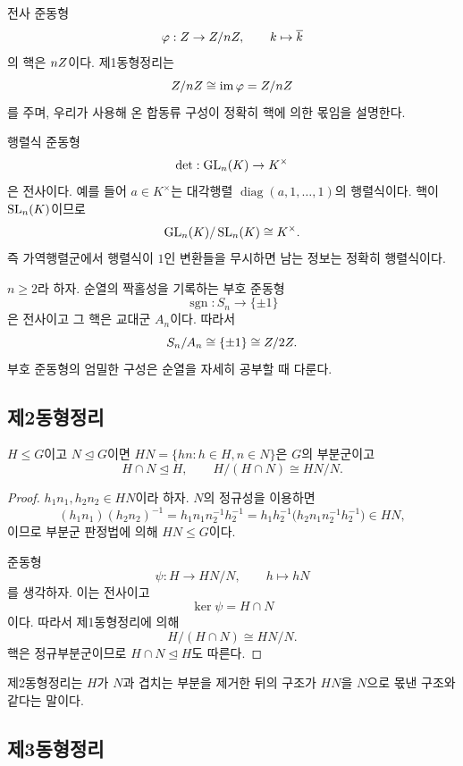 \begin{example}[합동류]
전사 준동형
\[
  \varphi:Z\to Z/nZ,
  \qquad k\mapsto\overline k
\]
의 핵은 $nZ$이다. 제1동형정리는
\[
  Z/nZ\cong\operatorname{im}\varphi=Z/nZ
\]
를 주며, 우리가 사용해 온 합동류 구성이 정확히 핵에 의한 몫임을 설명한다.
\end{example}

\begin{example}
행렬식 준동형
\[
  \det:\operatorname{GL}_n(K)\to K^\times
\]
은 전사이다. 예를 들어 $a\in K^\times$는 대각행렬 $\operatorname{diag}(a,1,\dots,1)$의 행렬식이다. 핵이 $\operatorname{SL}_n(K)$이므로
\[
  \operatorname{GL}_n(K)/\operatorname{SL}_n(K)\cong K^\times.
\]
즉 가역행렬군에서 행렬식이 $1$인 변환들을 무시하면 남는 정보는 정확히 행렬식이다.
\end{example}

\begin{example}[부호 준동형]
$n\ge2$라 하자. 순열의 짝홀성을 기록하는 부호 준동형
\[
  \operatorname{sgn}:S_n\to\{\pm1\}
\]
은 전사이고 그 핵은 교대군 $A_n$이다. 따라서
\[
  S_n/A_n\cong\{\pm1\}\cong Z/2Z.
\]
부호 준동형의 엄밀한 구성은 순열을 자세히 공부할 때 다룬다.
\end{example}

\subsection{제2동형정리}

\begin{theorem}[제2동형정리]
$H\le G$이고 $N\trianglelefteq G$이면 $HN=\{hn:h\in H,n\in N\}$은 $G$의 부분군이고
\[
  H\cap N\trianglelefteq H,
  \qquad
  H/(H\cap N)\cong HN/N.
\]
\end{theorem}

\begin{proof}
$h_1n_1,h_2n_2\in HN$이라 하자. $N$의 정규성을 이용하면
\[
  (h_1n_1)(h_2n_2)^{-1}
  =h_1n_1n_2^{-1}h_2^{-1}
  =h_1h_2^{-1}\bigl(h_2n_1n_2^{-1}h_2^{-1}\bigr)\in HN,
\]
이므로 부분군 판정법에 의해 $HN\le G$이다.

준동형
\[
  \psi:H\to HN/N,
  \qquad h\mapsto hN
\]
를 생각하자. 이는 전사이고
\[
  \ker\psi=H\cap N
\]
이다. 따라서 제1동형정리에 의해
\[
  H/(H\cap N)\cong HN/N.
\]
핵은 정규부분군이므로 $H\cap N\trianglelefteq H$도 따른다.
\end{proof}

제2동형정리는 $H$가 $N$과 겹치는 부분을 제거한 뒤의 구조가 $HN$을 $N$으로 몫낸 구조와 같다는 말이다.

\subsection{제3동형정리}

